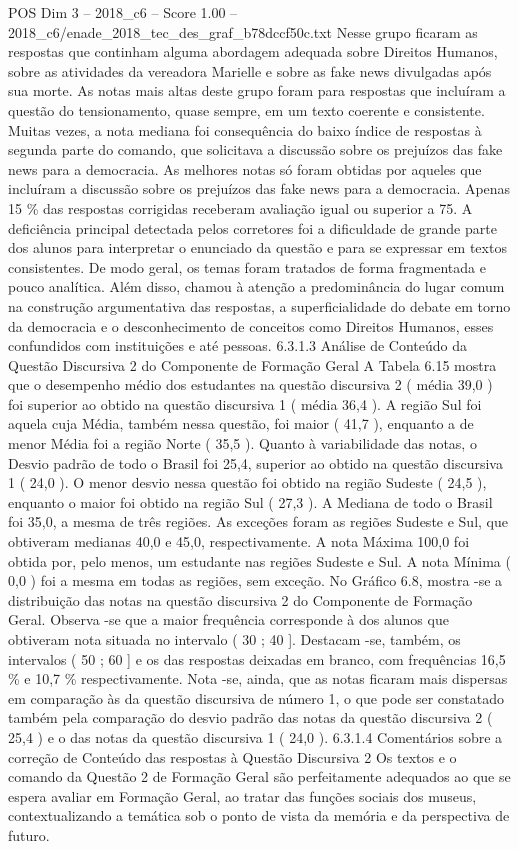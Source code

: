 \begin{textsample}{POS Dim 3 – 2018\_c6 – Score 1.00 – 2018\_c6/enade\_2018\_tec\_des\_graf\_b78dccf50c.txt}
Nesse grupo ficaram as respostas que continham alguma abordagem adequada sobre Direitos Humanos, sobre as atividades da vereadora Marielle e sobre as fake news divulgadas após sua morte.
As notas mais altas deste grupo foram para respostas que incluíram a questão do tensionamento, quase sempre, em um texto coerente e consistente.
Muitas vezes, a nota mediana foi consequência do baixo índice de respostas à segunda parte do comando, que solicitava a discussão sobre os prejuízos das fake news para a democracia.
As melhores notas só foram obtidas por aqueles que incluíram a discussão sobre os prejuízos das fake news para a democracia.
Apenas 15 \% das respostas corrigidas receberam avaliação igual ou superior a 75.
A deficiência principal detectada pelos corretores foi a dificuldade de grande parte dos alunos para interpretar o enunciado da questão e para se expressar em textos consistentes.
De modo geral, os temas foram tratados de forma fragmentada e pouco analítica.
Além disso, chamou à atenção a predominância do lugar comum na construção argumentativa das respostas, a superficialidade do debate em torno da democracia e o desconhecimento de conceitos como Direitos Humanos, esses confundidos com instituições e até pessoas. 6.3.1.3 Análise de Conteúdo da Questão Discursiva 2 do Componente de Formação Geral A Tabela 6.15 mostra que o desempenho médio dos estudantes na questão discursiva 2 ( média 39,0 ) foi superior ao obtido na questão discursiva 1 ( média 36,4 ).
A região Sul foi aquela cuja Média, também nessa questão, foi maior ( 41,7 ), enquanto a de menor Média foi a região Norte ( 35,5 ).
Quanto à variabilidade das notas, o Desvio padrão de todo o Brasil foi 25,4, superior ao obtido na questão discursiva 1 ( 24,0 ).
O menor desvio nessa questão foi obtido na região Sudeste ( 24,5 ), enquanto o maior foi obtido na região Sul ( 27,3 ).
A Mediana de todo o Brasil foi 35,0, a mesma de três regiões.
As exceções foram as regiões Sudeste e Sul, que obtiveram medianas 40,0 e 45,0, respectivamente.
A nota Máxima 100,0 foi obtida por, pelo menos, um estudante nas regiões Sudeste e Sul.
A nota Mínima ( 0,0 ) foi a mesma em todas as regiões, sem exceção.
No Gráfico 6.8, mostra -se a distribuição das notas na questão discursiva 2 do Componente de Formação Geral.
Observa -se que a maior frequência corresponde à dos alunos que obtiveram nota situada no intervalo ( 30 ; 40 ].
Destacam -se, também, os intervalos ( 50 ; 60 ] e os das respostas deixadas em branco, com frequências 16,5 \% e 10,7 \% respectivamente.
Nota -se, ainda, que as notas ficaram mais dispersas em comparação às da questão discursiva de número 1, o que pode ser constatado também pela comparação do desvio padrão das notas da questão discursiva 2 ( 25,4 ) e o das notas da questão discursiva 1 ( 24,0 ). 6.3.1.4 Comentários sobre a correção de Conteúdo das respostas à Questão Discursiva 2 Os textos e o comando da Questão 2 de Formação Geral são perfeitamente adequados ao que se espera avaliar em Formação Geral, ao tratar das funções sociais dos museus, contextualizando a temática sob o ponto de vista da memória e da perspectiva de futuro.

\end{textsample}
